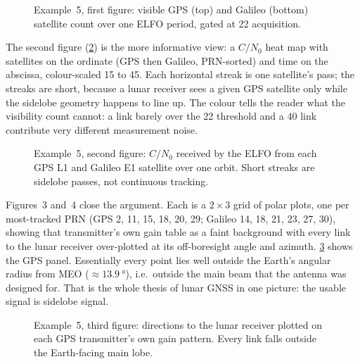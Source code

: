 \begin{figure}[htbp]
  \centering
  \caption{Example~5, first figure: visible GPS (top) and Galileo (bottom)
           satellite count over one ELFO period, gated at \SI{22}{\dBHz}
           acquisition.}
  \label{fig:tut-ex5-vis}
\end{figure}

The second figure (\cref{fig:tut-ex5-cn0}) is the more informative view: a
$C/N_0$ heat map with satellites on the ordinate (GPS then Galileo, PRN-sorted)
and time on the abscissa, colour-scaled \SI{15}{} to \SI{45}{\dBHz}. Each
horizontal streak is one satellite's pass; the streaks are short, because a lunar
receiver sees a given GPS satellite only while the sidelobe geometry happens to
line up. The colour tells the reader what the visibility count cannot: a link
barely over the \SI{22}{\dBHz} threshold and a \SI{40}{\dBHz} link contribute
very different measurement noise.

\begin{figure}[htbp]
  \centering
  \caption{Example~5, second figure: $C/N_0$ received by the ELFO from each GPS
           L1 and Galileo E1 satellite over one orbit. Short streaks are
           sidelobe passes, not continuous tracking.}
  \label{fig:tut-ex5-cn0}
\end{figure}

Figures~3 and~4 close the argument. Each is a $2\times3$ grid of polar plots,
one per most-tracked PRN (GPS 2, 11, 15, 18, 20, 29; Galileo 14, 18, 21, 23, 27,
30), showing that transmitter's own gain table as a faint background with every
link to the lunar receiver over-plotted at its off-boresight angle and azimuth.
\cref{fig:tut-ex5-polar} shows the GPS panel. Essentially every point lies well
outside the Earth's angular radius from MEO ($\approx\SI{13.9}{\degree}$), i.e.\
outside the main beam that the antenna was designed for. That is the whole thesis
of lunar GNSS in one picture: the usable signal is sidelobe signal.

\begin{figure}[htbp]
  \centering
  \caption{Example~5, third figure: directions to the lunar receiver plotted on
           each GPS transmitter's own gain pattern. Every link falls outside the
           Earth-facing main lobe.}
  \label{fig:tut-ex5-polar}
\end{figure}

